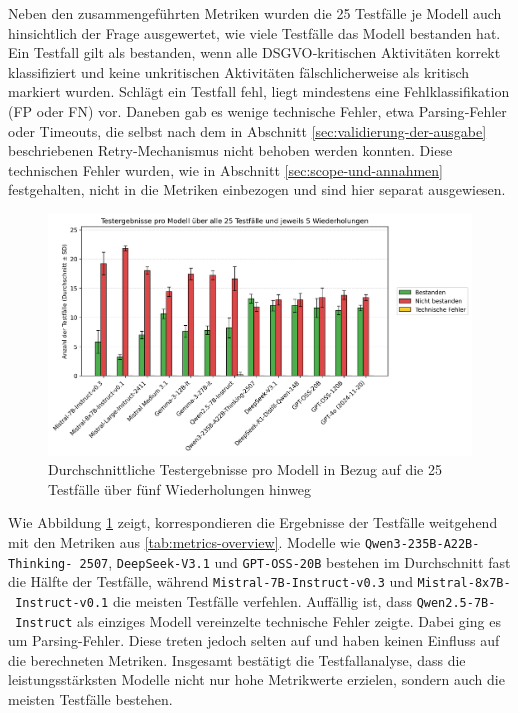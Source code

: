 Neben den zusammengeführten Metriken wurden die 25 Testfälle je Modell auch hinsichtlich der Frage ausgewertet, wie viele Testfälle das Modell bestanden hat. Ein Testfall gilt als bestanden, wenn alle \ac{DSGVO}‑kritischen Aktivitäten korrekt klassifiziert und keine unkritischen Aktivitäten fälschlicherweise als kritisch markiert wurden. Schlägt ein Testfall fehl, liegt mindestens eine Fehlklassifikation (\ac{FP} oder \ac{FN}) vor. Daneben gab es wenige technische Fehler, etwa Parsing‑Fehler oder Timeouts, die selbst nach dem in Abschnitt  \ref{sec:validierung-der-ausgabe} beschriebenen Retry‑Mechanismus nicht behoben werden konnten. Diese technischen Fehler wurden, wie in Abschnitt \ref{sec:scope-und-annahmen} festgehalten, nicht in die Metriken einbezogen und sind hier separat ausgewiesen.

\begin{figure}[htbp]
    \centering
    \includegraphics[width=\textwidth]{images/results/evaluation_testcase_outcomes_grouped}
    \caption{Durchschnittliche Testergebnisse pro Modell in Bezug auf die 25 Testfälle über fünf Wiederholungen hinweg}
    \label{fig:results-testcase-outcomes}
\end{figure}

Wie Abbildung \ref{fig:results-testcase-outcomes} zeigt, korrespondieren die Ergebnisse der Testfälle weitgehend mit den Metriken aus \autoref{tab:metrics-overview}. Modelle wie \texttt{Qwen3-235B-A22B-Thinking-\linebreak~2507}, \texttt{DeepSeek-V3.1} und \texttt{GPT-OSS-20B} bestehen im Durchschnitt fast die Hälfte der Testfälle, während \texttt{Mistral-7B-Instruct-v0.3} und \texttt{Mistral-8x7B-\linebreak~Instruct-v0.1} die meisten Testfälle verfehlen. Auffällig ist, dass \texttt{Qwen2.5-7B-\linebreak~Instruct} als einziges Modell vereinzelte technische Fehler zeigte. Dabei ging es um Parsing-Fehler. Diese treten jedoch selten auf und haben keinen Einfluss auf die berechneten Metriken. Insgesamt bestätigt die Testfallanalyse, dass die leistungsstärksten Modelle nicht nur hohe Metrikwerte erzielen, sondern auch die meisten Testfälle bestehen.